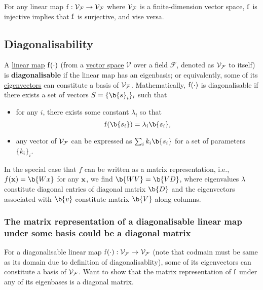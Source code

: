 \begin{remark}
For any linear map $\operatorname{f}: \mathcal{V}_{\mathcal{F}} \to \mathcal{V}_{\mathcal{F}}$ where $\mathcal{V}_{\mathcal{F}}$ is a finite-dimension vector space, $\operatorname{f}$ is injective implies that $\operatorname{f}$ is surjective, and vise versa.
\end{remark}









\subsection{Diagonalisability}

\begin{definition}\label{def:diagonalisable}
A \hyperref[def:linear-map]{linear map} $\operatorname{f}(\cdot)$ (from a \hyperref[def:vector-space]{vector space} $\mathcal{V}$ over a field $\mathcal{F}$, denoted as $\mathcal{V}_{\mathcal{F}}$ to itself) is \textbf{diagonalisable} if the linear map has an eigenbasis; or equivalently, some of its \underline{eigenvectors} can constitute a basis of $\mathcal{V}_{\mathcal{F}}$.
Mathematically, $\operatorname{f}(\cdot)$ is diagonalisable if there exists a set of vectors $S = \{ \b{s}_i \}_i$ such that 
\begin{itemize}
    \item for any $i$, there exists some constant $\lambda_i$ so that
    $$
    \f(\b{s_i}) = \lambda_i \b{s_i},
    $$
    \item any vector of $\mathcal{V}_{\mathcal{F}}$ can be expressed as $\sum_i k_i \b{s_i} $ for a set of parameters $\{ k_i \}_i$.
\end{itemize}

\end{definition}


In the special case that $f$ can be written as a matrix representation, i.e., $f(\x) = \b{Wx}$ for any $\mathbf{x}$, we find $\b{WV}= \b{VD}$, where eigenvalues $\lambda$ constitute diagonal entries of diagonal matrix $\b{D}$ and the eigenvectors associated with $\b{v}$ constitute matrix $\b{V}$ along columns.





\subsubsection{The matrix representation of a diagonalisable linear map under some basis could be a diagonal matrix}

For a diagonalisable linear map $\operatorname{f}(\cdot): \mathcal{V}_{\mathcal{F}} \to \mathcal{V}_{\mathcal{F}}$ (note that codmain must be same as its domain due to definition of diagonalisablity), some of its eigenvectors can constitute a basis of $\mathcal{V}_{\mathcal{F}}$. Want to show that the matrix representation of $\operatorname{f}$ under any of its eigenbases is a diagonal matrix.
 
